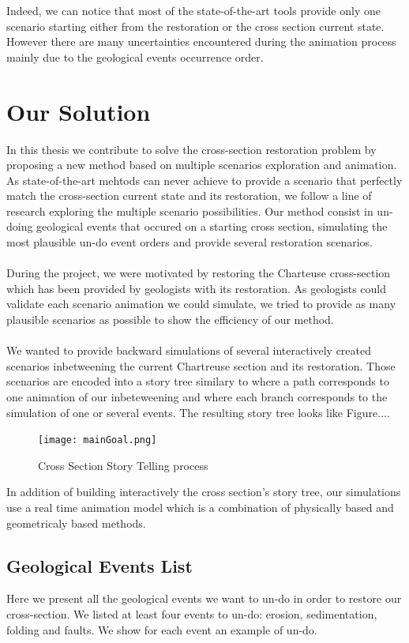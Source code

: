 \documentclass[12pt, a4paper]{memoir} %
\begin{document}
%
Indeed, we can notice that most of the state-of-the-art tools provide only one scenario starting either from the restoration or the cross section current state. However there are many uncertainties encountered during the animation process mainly due to the geological events occurrence order.
%
\chapter{Our Solution}

In this thesis we contribute to solve the cross-section restoration problem by proposing a new method based on multiple scenarios exploration and animation. As state-of-the-art mehtods can never achieve to provide a scenario that perfectly match the cross-section current state and its restoration, we follow a line of research exploring the multiple scenario possibilities.
Our method consist in un-doing geological events that occured on a starting cross section, simulating the most plausible un-do event orders and provide several restoration scenarios.\\\\

During the project, we were motivated by restoring the Charteuse cross-section which has been provided by geologists with its restoration. As geologists could validate each scenario animation we could simulate, we tried to provide as many plausible scenarios as possible to show the efficiency of our method.\\\\
We wanted to provide backward simulations of several interactively created scenarios inbetweening the current Chartreuse section and its restoration. Those scenarios are encoded into a story tree similary to \cite{lidal} where a path corresponds to one animation of our inbeteweening and where each branch corresponds to the simulation of one or several events. The resulting story tree looks like Figure....

 \begin{figure}[H]
	\centering
	\texttt{[image: mainGoal.png]}
	\caption{Cross Section Story Telling process}
\end{figure}

In addition of building interactively the cross section's story tree, our simulations use a real time animation model which is a combination of physically based and geometricaly based methods.

\section{Geological Events List}
Here we present all the geological events we want to un-do in order to restore our cross-section.
We listed at least four events to un-do: erosion, sedimentation, folding and faults. We show for each event an example of un-do.
\end{document}
